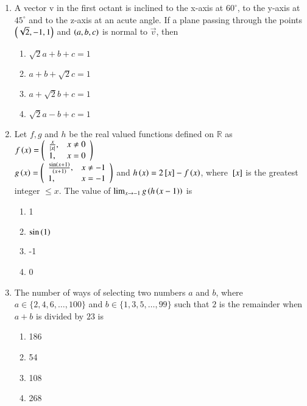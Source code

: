 \documentclass[journal,9pt,onecolumn]{IEEEtran}
\begin{document}
\begin{enumerate}
\item A vector v in the first octant is inclined to the x-axis at $60^\circ$, to the y-axis at $45^\circ$ and to the z-axis at an acute angle. If a plane passing through the points $\left(\sqrt{2}, -1, 1\right)$ and $\left(a, b, c\right)$ is normal to $\overrightarrow{v}$, then
\begin{multicols}{2}
\begin{enumerate}
    \item $\sqrt{2}a + b + c = 1$
    \item $a + b + \sqrt{2}c = 1$
    \item $a + \sqrt{2}b + c = 1$
    \item $\sqrt{2}a - b + c = 1$
\end{enumerate}
\end{multicols}

\item Let $f, g$ and $h$ be the real valued functions defined on $\mathbb{R}$ as $f \left(x\right) = \left( 
\begin{array}{ll}
\frac{x}{\left\vert x\right\vert}, & x \neq 0 \\
1, & x = 0 
\end{array}
\right)$ \\
$g \left(x\right) = \left( 
\begin{array}{ll}
\frac{\sin \left(x + 1\right)}{\left(x + 1\right)}, & x \neq -1 \\
1, & x = -1 
\end{array}
\right)$ and $h\left(x\right) = 2{}\left[x\right] - f\left(x\right)$, where ${}\left[x\right]$ is the greatest integer $\leq x$. The value of $\lim_{x \to -1} g \left(h \left(x - 1\right)\right) $ is 
\begin{multicols}{4}
\begin{enumerate}
    \item 1 
    \item $\sin\left(1\right)$ 
    \item -1 
    \item 0
\end{enumerate}
\end{multicols}

\item The number of ways of selecting two numbers $a$ and $b$, where $a \in \{2, 4, 6, \ldots, 100\} $ and $b \in \{1, 3, 5, \ldots, 99\} $ such that $2$ is the remainder when $a + b$ is divided by $23$ is 
\begin{multicols}{4}
\begin{enumerate}
    \item 186 
    \item 54 
    \item 108 
    \item 268 
\end{enumerate}
\end{multicols}



\end{enumerate}
\end{document}
